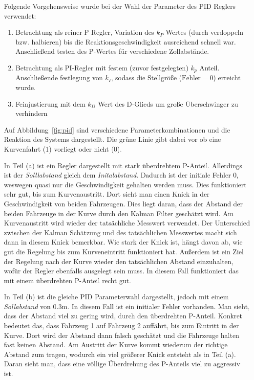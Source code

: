 Folgende Vorgehensweise wurde bei der Wahl der Parameter des PID Reglers
verwendet:
\begin{enumerate}
    \item Betrachtung als reiner P-Regler, Variation des $k_P$ Wertes (durch
        verdoppeln bzw. halbieren) bis die Reaktionsgeschwindigkeit ausreichend
        schnell war. Anschließend testen des P-Wertes für verschiedene
        Zollabstände.
    \item Betrachtung als PI-Regler mit festem (zuvor festgelegten) $k_p$
        Anteil. Anschließende festlegung von $k_I$, sodass die Stellgröße
        ($\mathrm{Fehler} = 0$) erreicht wurde.
    \item Feinjustierung mit dem $k_D$ Wert des D-Glieds um große Überschwinger
        zu verhindern
\end{enumerate}
Auf Abbildung~\ref{fig:pid} sind verschiedene Parameterkombinationen und die
Reaktion des Systems dargestellt. Die grüne Linie gibt dabei vor ob eine
Kurvenfahrt (1) vorliegt oder nicht (0). 

In Teil (a) ist ein Regler dargestellt mit stark überdrehtem P-Anteil.
Allerdings ist der \textit{Solllabstand} gleich dem \textit{Initalabstand}.
Dadurch ist der initiale Fehler 0, weswegen quasi nur die Geschwindigkeit
gehalten werden muss. Dies funktioniert sehr gut, bis zum Kurvenaustritt. Dort
sieht man einen Knick in der Geschwindigkeit von beiden Fahrzeugen. Dies liegt
daran, dass der Abstand der beiden Fahrzeuge in der Kurve durch den Kalman
Filter geschätzt wird. Am Kurvenaustritt wird wieder der tatsächliche Messwert
verwendet. Der Unterschied zwischen der Kalman Schätzung und des tatsächlichen
Messwertes macht sich dann in diesem Knick bemerkbar. Wie stark der Knick ist,
hängt davon ab, wie gut die Regelung bis zum Kurveneintritt funktioniert hat.
Außerdem ist ein Ziel der Regelung nach der Kurve wieder den tatsächlichen
Abstand einzuhalten, wofür der Regler ebenfalls ausgelegt sein muss. In diesem
Fall funktioniert das mit einem überdrehten P-Anteil recht gut.

In Teil (b) ist die gleiche PID Parameterwahl dargestellt, jedoch mit einem
\textit{Sollabstand} von $0.3 \mathrm{m}$. In diesem Fall ist ein initialer
Fehler vorhanden. Man sieht, dass der Abstand viel zu gering wird, durch den
überdrehten P-Anteil. Konkret bedeutet das, dass Fahrzeug 1 auf Fahrzeug 2
auffährt, bis zum Eintritt in der Kurve. Dort wird der Abstand dann falsch
geschätzt und die Fahrzeuge halten fast keinen Abstand. Am Austritt der Kurve
kommt wiederum der richtige Abstand zum tragen, wodurch ein viel größerer Knick
entsteht als in Teil (a). Daran sieht man, dass eine völlige Überdrehung des
P-Anteils viel zu aggressiv ist.

